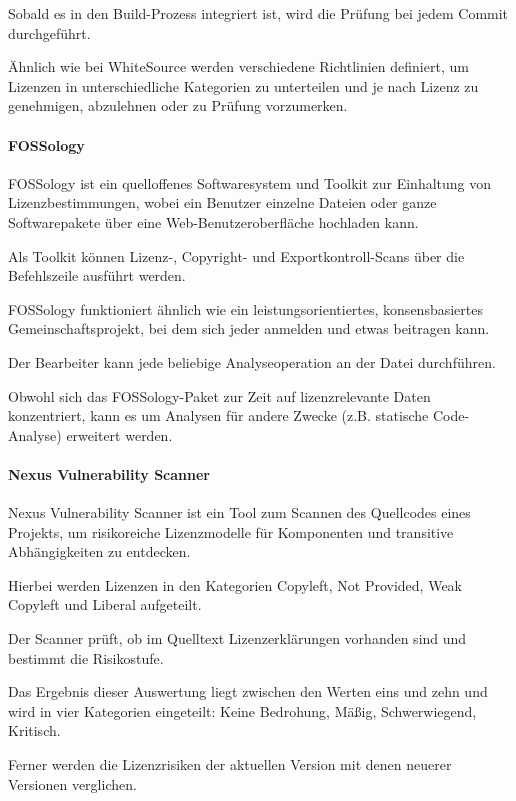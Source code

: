 Sobald es in den Build-Prozess integriert ist, wird die Prüfung bei jedem Commit durchgeführt. 

Ähnlich wie bei WhiteSource werden verschiedene Richtlinien definiert, um Lizenzen in unterschiedliche Kategorien zu unterteilen und je nach Lizenz zu genehmigen, abzulehnen oder zu Prüfung vorzumerken. 

\paragraph{FOSSology}

FOSSology ist ein quelloffenes Softwaresystem und Toolkit zur Einhaltung von Lizenzbestimmungen, wobei ein Benutzer einzelne Dateien oder ganze Softwarepakete über eine Web-Benutzeroberfläche hochladen kann. \cite{} 

Als Toolkit können Lizenz-, Copyright- und Exportkontroll-Scans über die Befehlszeile ausführt werden.

FOSSology funktioniert ähnlich wie ein leistungsorientiertes, konsensbasiertes Gemeinschaftsprojekt, bei dem sich jeder anmelden und etwas beitragen kann. 

Der Bearbeiter kann jede beliebige Analyseoperation an der Datei durchführen. 

Obwohl sich das FOSSology-Paket zur Zeit auf lizenzrelevante Daten konzentriert, kann es um Analysen für andere Zwecke (z.B. statische Code-Analyse) erweitert werden.

\paragraph{Nexus Vulnerability Scanner}

Nexus Vulnerability Scanner ist ein Tool zum Scannen des Quellcodes eines Projekts, um risikoreiche Lizenzmodelle für Komponenten und transitive Abhängigkeiten zu entdecken. \cite{} 

Hierbei werden Lizenzen in den Kategorien Copyleft, Not Provided, Weak Copyleft und Liberal aufgeteilt. 

Der Scanner prüft, ob im Quelltext Lizenzerklärungen vorhanden sind und bestimmt die Risikostufe. 

Das Ergebnis dieser Auswertung liegt zwischen den Werten eins und zehn und wird in vier Kategorien eingeteilt: Keine Bedrohung, Mäßig, Schwerwiegend, Kritisch. \cite{} 

Ferner werden die Lizenzrisiken der aktuellen Version mit denen neuerer Versionen verglichen. 

